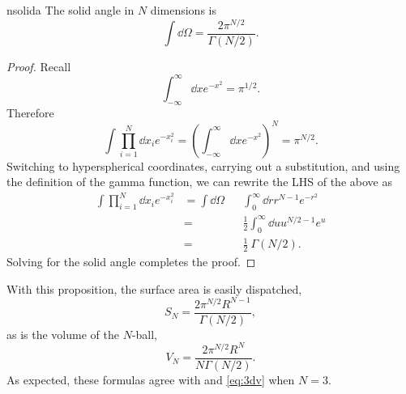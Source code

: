 \begin{proposition}{}{nsolida}
The solid angle in $N$ dimensions is
$$
  \int\dd{\Omega}=\frac{2\pi^{N/2}}{\Gamma(N/2)}.
$$
\begin{proof}
  Recall 
  $$
    \int_{-\infty}^\infty\dd{x}e^{-x^2}=\pi^{1/2}.
  $$
  Therefore
  $$ 
    \int\prod_{i=1}^N\dd{x_i}e^{-x_i^2} 
      =\left(\int_{-\infty}^\infty\dd{x}e^{-x^2}\right)^N=\pi^{N/2}.
  $$
  Switching to hyperspherical coordinates, carrying out
  a substitution, and using the definition of the gamma function,
  we can rewrite the LHS of the above as
  \begin{equation*}\begin{aligned}
    \int\prod_{i=1}^N\dd{x_i}e^{-x_i^2}
       &=\int\dd{\Omega}&&\int_0^\infty\dd{r}r^{N-1}e^{-r^2}\\
       &=&&\frac{1}{2}\int_0^\infty\dd{u}u^{N/2-1}e^u\\
       &=&&\frac{1}{2}~\Gamma(N/2).
  \end{aligned}\end{equation*}
  Solving for the solid angle completes the proof. 
\end{proof}
\end{proposition}
With this proposition, the surface area is easily dispatched,
\begin{equation}
  S_N=\frac{2\pi^{N/2}R^{N-1}}{\Gamma(N/2)},
\end{equation}
as is the volume of the $N$-ball,
\begin{equation}
  V_N=\frac{2\pi^{N/2}R^N}{N\Gamma(N/2)}.
\end{equation}
As expected, these formulas agree with 
and \eqref{eq:3dv} when $N=3$.

